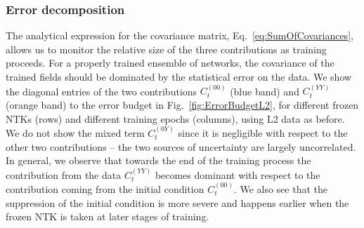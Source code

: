 \subsubsection{Error decomposition}
\label{sec:ErrorDec}
The analytical expression for the covariance matrix,
Eq.~\eqref{eq:SumOfCovariances}, allows us to monitor the relative size of the
three contributions as training proceeds. For a properly trained ensemble of
networks, the covariance of the trained fields should be dominated by the
statistical error on the data. We show the diagonal entries of the two
contributions $C_t^{(00)}$ (blue band) and $C_t^{(YY)}$ (orange band) to the
error budget in Fig.~\ref{fig:ErrorBudgetL2}, for different frozen NTKs (rows)
and different training epochs (columns), using L2 data as before. We do not show
the mixed term $C_t^{(0Y)}$ since it is negligible with respect to the other two
contributions -- the two sources of uncertainty are largely uncorrelated. In
general, we observe that towards the end of the training process the
contribution from the data $C_t^{(YY)}$ becomes dominant with respect to the
contribution coming from the initial condition $C_t^{(00)}$. We also see that
the suppression of the initial condition is more severe and happens earlier when
the frozen NTK is taken at later stages of training.

